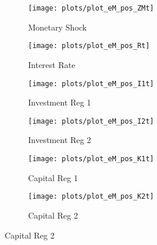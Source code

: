 \documentclass[../thesis.tex]{subfiles}
\begin{document}
	\begin{figure}[h!]
		\centering
		\caption{Positive-Monetary-Shock Impulse Response Functions}
		\begin{subfigure}[b]{0.27\textwidth}
			\centering
			\texttt{[image: plots/plot\_eM\_pos\_ZMt]}
			\caption{\scriptsize Monetary Shock}
			\label{fig:ZMt-ZMt}
		\end{subfigure}
		\hspace*{0.5cm}
		\begin{subfigure}[b]{0.27\textwidth}
			\centering
			\texttt{[image: plots/plot\_eM\_pos\_Rt]}
			\caption{\scriptsize Interest Rate}
			\label{fig:ZMt-Rt}
		\end{subfigure}
		\hspace*{0.5cm}
		\begin{subfigure}[b]{0.27\textwidth}
			\centering
			\texttt{[image: plots/plot\_eM\_pos\_I1t]}
			\caption{\scriptsize Investment Reg 1}
			\label{fig:ZMt-I1t}
		\end{subfigure}
		\vspace*{0.1cm}
		\begin{subfigure}[b]{0.27\textwidth}
			\centering
			\texttt{[image: plots/plot\_eM\_pos\_I2t]}
			\caption{\scriptsize Investment Reg 2}
			\label{fig:ZMt-I2t}
		\end{subfigure}
		\hspace*{0.5cm}
		\begin{subfigure}[b]{0.27\textwidth}
			\centering
			\texttt{[image: plots/plot\_eM\_pos\_K1t]}
			\caption{\scriptsize Capital Reg 1}
			\label{fig:ZMt-K1t}
		\end{subfigure}
		\hspace*{0.5cm}
		\begin{subfigure}[b]{0.27\textwidth}
			\centering
			\texttt{[image: plots/plot\_eM\_pos\_K2t]}
			\caption{\scriptsize Capital Reg 2}
			\label{fig:ZMt-K2t}

\end{subfigure}
\end{figure}
\end{document}
